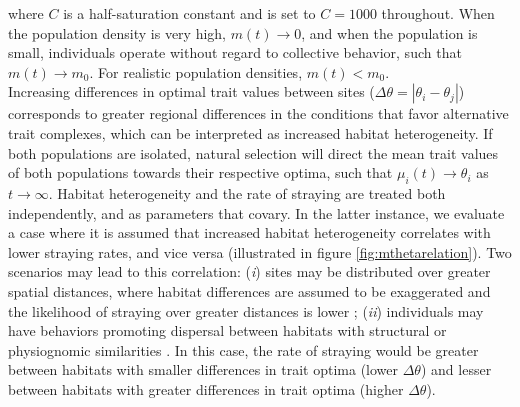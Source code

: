 \documentclass{revtex4}
\begin{document}
\noindent where $C$ is a half-saturation constant and is set to $C=1000$ throughout.
When the population density is very high, $m(t) \rightarrow 0$, and when the population is small, individuals operate without regard to collective behavior, such that $m(t) \rightarrow m_0$.
For realistic population densities, $m(t) < m_0$.\\


\noindent Increasing differences in optimal trait values between sites ($\Delta\theta = \left|\theta_i - \theta_j\right|$) corresponds to greater regional differences in the conditions that favor alternative trait complexes, which can be interpreted as increased habitat heterogeneity.
If both populations are isolated, natural selection will direct the mean trait values of both populations towards their respective optima, such that $\mu_i(t) \rightarrow \theta_i$ as $t\rightarrow\infty$.
Habitat heterogeneity and the rate of straying are treated both independently, and as parameters that covary.
In the latter instance, we evaluate a case where it is assumed that increased habitat heterogeneity correlates with lower straying rates, and vice versa (illustrated in figure \ref{fig:mthetarelation}).
Two scenarios may lead to this correlation: 
(\emph{i}) sites may be distributed over greater spatial distances, where habitat differences are assumed to be exaggerated and the likelihood of straying over greater distances is lower \citep{Candy:2000hu,JPE:JPE1383};
(\emph{ii}) individuals may have behaviors promoting dispersal between habitats with structural or physiognomic similarities \citep{Peterson:2014gy}.
In this case, the rate of straying would be greater between habitats with smaller differences in trait optima (lower $\Delta\theta$) and lesser between habitats with greater differences in trait optima (higher $\Delta\theta$).
\\
\end{document}
